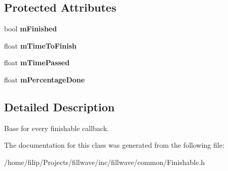 \subsection*{Protected Attributes}
\begin{DoxyCompactItemize}
\item 
bool {\bfseries m\+Finished}\hypertarget{classflw_1_1flf_1_1Finishable_a7ece5edd33fd456e1845ca7c9e209882}{}\label{classflw_1_1flf_1_1Finishable_a7ece5edd33fd456e1845ca7c9e209882}

\item 
float {\bfseries m\+Time\+To\+Finish}\hypertarget{classflw_1_1flf_1_1Finishable_a4c1792287327a12b3089faef3bae7a4f}{}\label{classflw_1_1flf_1_1Finishable_a4c1792287327a12b3089faef3bae7a4f}

\item 
float {\bfseries m\+Time\+Passed}\hypertarget{classflw_1_1flf_1_1Finishable_a51e6bc00dfe9b1a7726e7f6fde2dc9ce}{}\label{classflw_1_1flf_1_1Finishable_a51e6bc00dfe9b1a7726e7f6fde2dc9ce}

\item 
float {\bfseries m\+Percentage\+Done}\hypertarget{classflw_1_1flf_1_1Finishable_a8da70d226a3aa1663a328aa4eaefbd1d}{}\label{classflw_1_1flf_1_1Finishable_a8da70d226a3aa1663a328aa4eaefbd1d}

\end{DoxyCompactItemize}


\subsection{Detailed Description}
Base for every finishable callback. 

The documentation for this class was generated from the following file\+:\begin{DoxyCompactItemize}
\item 
/home/filip/\+Projects/fillwave/inc/fillwave/common/Finishable.\+h\end{DoxyCompactItemize}
